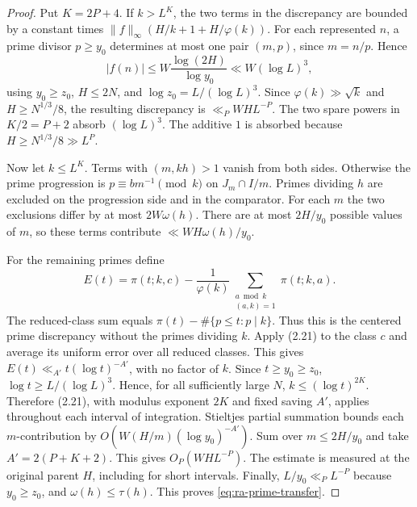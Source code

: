\begin{proof}
Put \(K=2P+4\). If \(k>L^K\), the two terms in the discrepancy are
bounded by a constant times \(\|f\|_\infty(H/k+1+H/\varphi(k))\).
For each represented \(n\), a prime divisor \(p\ge y_0\) determines at
most one pair \((m,p)\), since \(m=n/p\). Hence
\[
 |f(n)|\le W\frac{\log(2H)}{\log y_0}
 \ll W(\log L)^3,
\]
using \(y_0\ge z_0\), \(H\le2N\), and
\(\log z_0=L/(\log L)^3\). Since \(\varphi(k)\gg\sqrt{k}\) and
\(H\ge N^{1/3}/8\), the resulting discrepancy is
\(\ll_P WHL^{-P}\). The two spare powers in \(K/2=P+2\) absorb
\((\log L)^3\). The additive \(1\) is absorbed because
\(H\ge N^{1/3}/8\gg L^P\).

Now let \(k\le L^K\). Terms with \((m,kh)>1\) vanish from both sides.
Otherwise the prime progression is \(p\equiv bm^{-1}\pmod{k}\) on
\(J_m\cap I/m\).
Primes dividing \(h\) are excluded on the progression side and in the
comparator.
For each \(m\) the two exclusions differ by at most
\(2W\omega(h)\).
There are at most \(2H/y_0\) possible
values of \(m\), so these terms contribute
\(\ll WH\omega(h)/y_0\).

For the remaining primes define
\[
 E(t)=\pi(t;k,c)-\frac1{\varphi(k)}
       \sum_{\substack{a\bmod k\\(a,k)=1}}\pi(t;k,a).
\]
The reduced-class sum equals \(\pi(t)-\#\{p\le t:p\mid k\}\).
Thus this is the centered prime discrepancy without the primes dividing \(k\).
Apply (2.21) to the class \(c\) and average its uniform error over
all reduced classes.
This gives \(E(t)\ll_{A'}t(\log t)^{-A'}\), with no factor
of \(k\). Since \(t\ge y_0\ge z_0\),
\(\log t\ge L/(\log L)^3\). Hence, for all sufficiently large \(N\),
\(k\le(\log t)^{2K}\).
Therefore (2.21), with modulus exponent \(2K\)
and fixed saving \(A'\), applies throughout each interval of
integration. Stieltjes partial summation bounds each \(m\)-contribution
by \(O(W(H/m)(\log y_0)^{-A'})\). Sum over
\(m\le2H/y_0\) and take \(A'=2(P+K+2)\).
This gives \(O_P(WHL^{-P})\). The estimate is measured at the original parent
\(H\), including for short intervals. Finally,
\(L/y_0\ll_P L^{-P}\) because \(y_0\ge z_0\), and
\(\omega(h)\le\tau(h)\). This proves \eqref{eq:ra-prime-transfer}.
\end{proof}

